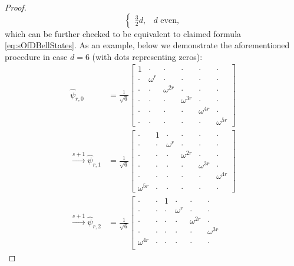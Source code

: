 \documentclass[10pt,a4paper]{amsart}
\begin{document}
\begin{proof}
\begin{equation}
\begin{cases}
        \frac{3}{2}d, & d \text{ even,}
        \end{cases}
\end{equation}
which can be further checked to be equivalent to claimed formula \eqref{eq:sOfDBellStates}. As an example, below we demonstrate the aforementioned procedure in case $d=6$ (with dots representing zeros):
\small
\begin{align}
\hat{\psi}_{r,0} &= \frac{1}{\sqrt{6}}
    \left[
    \begin{array}{ccc|ccc}
        1 & \cdot    & \cdot & \cdot & \cdot & \cdot \\
        \cdot   & \omega^r & \cdot & \cdot & \cdot & \cdot \\
        \cdot   & \cdot    & \omega^{2r} & \cdot & \cdot & \cdot \\
        \hline
        \cdot   & \cdot    & \cdot & \omega^{3r} & \cdot & \cdot \\
        \cdot   & \cdot    & \cdot & \cdot & \omega^{4r} & \cdot \\
        \cdot   & \cdot    & \cdot & \cdot & \cdot & \omega^{5r}
    \end{array} \right] \\
    \xrightarrow{s+1} \hat{\psi}_{r,1} &= \frac{1}{\sqrt{6}} \left[
    \begin{array}{cccccc}
        \cdot & 1 & \cdot & \cdot & \cdot & \cdot \\
        \cdot & \cdot & \omega^r & \cdot & \cdot & \cdot \\
        \cdot & \cdot & \cdot & \omega^{2r} & \cdot & \cdot \\
        \cdot & \cdot & \cdot & \cdot & \omega^{3r} & \cdot \\
        \cdot & \cdot & \cdot & \cdot & \cdot & \omega^{4r} \\
        \omega^{5r} & \cdot & \cdot & \cdot & \cdot & \cdot
    \end{array} \right] \nonumber \\
    \xrightarrow{s+1}\hat{\psi}_{r,2} &= \frac{1}{\sqrt{6}} \left[
    \begin{array}{cccccc}
        \cdot & \cdot & 1 & \cdot & \cdot & \cdot \\
        \cdot & \cdot & \cdot & \omega^r & \cdot & \cdot \\
        \cdot & \cdot & \cdot & \cdot & \omega^{2r} & \cdot \\
        \cdot & \cdot & \cdot & \cdot & \cdot & \omega^{3r} \\
        \omega^{4r} & \cdot & \cdot & \cdot & \cdot & \cdot \\

\end{array}
\end{align}
\end{proof}
\end{document}
